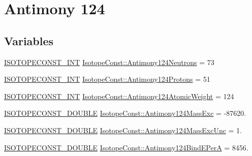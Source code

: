 \hypertarget{group___isotope_const-_antimony-_sb124}{}\section{Antimony 124}
\label{group___isotope_const-_antimony-_sb124}
\subsection*{Variables}
\begin{DoxyCompactItemize}
\item 
\mbox{\hyperlink{group___isotope_const-_macros_ga5f18360b3e99483a35c32d789e62621c}{I\+S\+O\+T\+O\+P\+E\+C\+O\+N\+S\+T\+\_\+\+I\+NT}} \mbox{\hyperlink{group___isotope_const-_antimony-_sb124_ga7c837e39f16f818763818d9813b1d2dd}{Isotope\+Const\+::\+Antimony124\+Neutrons}} = 73
\item 
\mbox{\hyperlink{group___isotope_const-_macros_ga5f18360b3e99483a35c32d789e62621c}{I\+S\+O\+T\+O\+P\+E\+C\+O\+N\+S\+T\+\_\+\+I\+NT}} \mbox{\hyperlink{group___isotope_const-_antimony-_sb124_ga45ae6e8d7463e3157c305d2bb41c120b}{Isotope\+Const\+::\+Antimony124\+Protons}} = 51
\item 
\mbox{\hyperlink{group___isotope_const-_macros_ga5f18360b3e99483a35c32d789e62621c}{I\+S\+O\+T\+O\+P\+E\+C\+O\+N\+S\+T\+\_\+\+I\+NT}} \mbox{\hyperlink{group___isotope_const-_antimony-_sb124_gaf78e8d3014b438099764de4a59ce5384}{Isotope\+Const\+::\+Antimony124\+Atomic\+Weight}} = 124
\item 
\mbox{\hyperlink{group___isotope_const-_macros_ga8f45a7272ce02c0b4c65c44636ed719a}{I\+S\+O\+T\+O\+P\+E\+C\+O\+N\+S\+T\+\_\+\+D\+O\+U\+B\+LE}} \mbox{\hyperlink{group___isotope_const-_antimony-_sb124_ga8901017f4d3a1ee30bf61e57eed1fd89}{Isotope\+Const\+::\+Antimony124\+Mass\+Exc}} = -\/87620.
\item 
\mbox{\hyperlink{group___isotope_const-_macros_ga8f45a7272ce02c0b4c65c44636ed719a}{I\+S\+O\+T\+O\+P\+E\+C\+O\+N\+S\+T\+\_\+\+D\+O\+U\+B\+LE}} \mbox{\hyperlink{group___isotope_const-_antimony-_sb124_gadeaebf5507e5a4c37119f481e3fa290d}{Isotope\+Const\+::\+Antimony124\+Mass\+Exc\+Unc}} = 1.
\item 
\mbox{\hyperlink{group___isotope_const-_macros_ga8f45a7272ce02c0b4c65c44636ed719a}{I\+S\+O\+T\+O\+P\+E\+C\+O\+N\+S\+T\+\_\+\+D\+O\+U\+B\+LE}} \mbox{\hyperlink{group___isotope_const-_antimony-_sb124_ga671d168a14c920c49acc6e23f8e3bae2}{Isotope\+Const\+::\+Antimony124\+Bind\+E\+PerA}} = 8456.
\item 

\end{DoxyCompactItemize}
